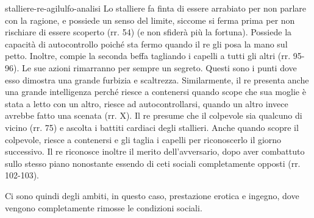 \documentclass[preview]{standalone}
\begin{document}
\begin{snippet}{stalliere-re-agilulfo-analisi}
    Lo stalliere fa finta di essere arrabiato per non parlare con la ragione, e
    possiede un senso del limite, siccome si ferma prima per non rischiare di essere scoperto (rr. 54) (e non sfiderà più la fortuna).
    Possiede la capacità di autocontrollo poiché sta fermo quando il re gli posa la mano
    sul petto. Inoltre, compie la seconda beffa tagliando i capelli a tutti gli altri (rr. 95-96).
    Le sue azioni rimarranno per sempre un segreto.
    Questi sono i punti dove esso dimostra una grande furbizia e scaltrezza.
    Similarmente, il re presenta anche una grande intelligenza
    perché riesce a contenersi quando scope che sua moglie è stata a letto con un altro,
    riesce ad autocontrollarsi, quando un altro invece avrebbe fatto una scenata (rr. X).
    Il re presume che il colpevole sia qualcuno di vicino (rr. 75) e ascolta i battiti
    cardiaci degli stallieri. Anche quando scopre il colpevole, riesce a contenersi e gli taglia
    i capelli per riconoscerlo il giorno successivo.
    Il re riconosce inoltre il merito dell'avversario, dopo aver combattuto sullo stesso
    piano nonostante essendo di ceti sociali completamente opposti (rr. 102-103).
    
    Ci sono quindi degli ambiti, in questo caso, prestazione erotica e ingegno,
    dove vengono completamente rimosse le condizioni sociali.
\end{snippet}
\end{document}
